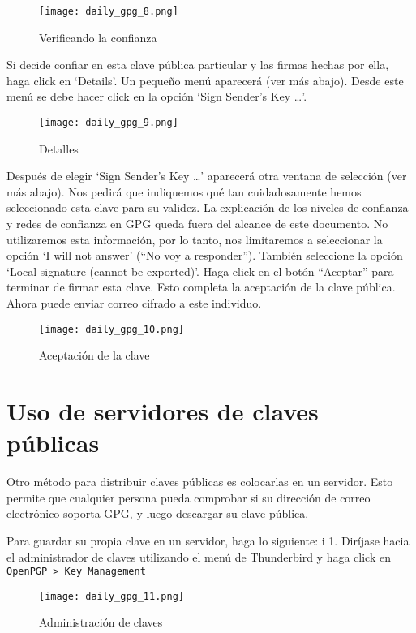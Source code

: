 \documentclass[10pt,a5paper,twoside,,]{book}
\begin{document}
\begin{figure}[htbp]
\centering
\texttt{[image: daily\_gpg\_8.png]}
\caption{Verificando la confianza}
\end{figure}

Si decide confiar en esta clave pública particular y las firmas hechas
por ella, haga click en `Details'. Un pequeño menú aparecerá (ver más
abajo). Desde este menú se debe hacer click en la opción `Sign Sender's
Key \ldots{}'.

\begin{figure}[htbp]
\centering
\texttt{[image: daily\_gpg\_9.png]}
\caption{Detalles}
\end{figure}

Después de elegir `Sign Sender's Key \ldots{}' aparecerá otra ventana de
selección (ver más abajo). Nos pedirá que indiquemos qué tan
cuidadosamente hemos seleccionado esta clave para su validez. La
explicación de los niveles de confianza y redes de confianza en GPG
queda fuera del alcance de este documento. No utilizaremos esta
información, por lo tanto, nos limitaremos a seleccionar la opción `I
will not answer' (``No voy a responder''). También seleccione la opción
`Local signature (cannot be exported)'. Haga click en el botón
``Aceptar'' para terminar de firmar esta clave. Esto completa la
aceptación de la clave pública. Ahora puede enviar correo cifrado a este
individuo.

\begin{figure}[htbp]
\centering
\texttt{[image: daily\_gpg\_10.png]}
\caption{Aceptación de la clave}
\end{figure}

\section{Uso de servidores de claves
públicas}\label{uso-de-servidores-de-claves-puxfablicas}

Otro método para distribuir claves públicas es colocarlas en un
servidor. Esto permite que cualquier persona pueda comprobar si su
dirección de correo electrónico soporta GPG, y luego descargar su clave
pública.

Para guardar su propia clave en un servidor, haga lo siguiente: i 1.
Diríjase hacia el administrador de claves utilizando el menú de
Thunderbird y haga click en
\texttt{OpenPGP\ \textgreater{}\ Key\ Management}

\begin{figure}[htbp]
\centering
\texttt{[image: daily\_gpg\_11.png]}
\caption{Administración de claves}
\end{figure}
\end{document}
